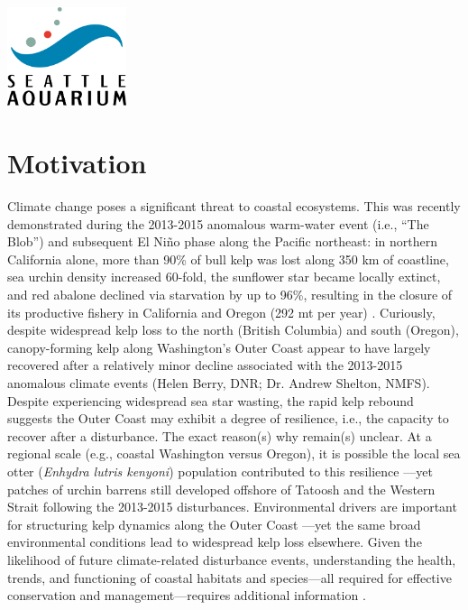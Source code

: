\documentclass[11pt]{article}
\begin{document}
\begin{titlepage}
\vspace{20pt}
\centering
\includegraphics[width=3.5cm]{logo.jpg}
\\
\end{titlepage}





\section{Motivation}
\label{Motivation}
Climate change poses a significant threat to coastal ecosystems. 
This was recently demonstrated during the 2013-2015 anomalous 
warm-water event (i.e., “The Blob”) and subsequent El Niño phase along 
the Pacific northeast: 
in northern California alone, 
more than 90\% of bull kelp was lost along 350 km of coastline, 
sea urchin density increased 60-fold, 
the sunflower star became locally extinct, 
and red abalone declined via starvation by up to 96\%, resulting in the 
closure of its productive fishery in California and Oregon (292 mt per 
year) \cite{Rogers-Bennett2019a, Gravem2021}.
Curiously, despite widespread kelp loss to the north (British Columbia) 
and south (Oregon), canopy-forming kelp along Washington's Outer Coast 
appear to have largely recovered after a relatively minor decline 
associated with the 2013-2015 anomalous climate events (Helen Berry, 
DNR; Dr. Andrew Shelton, NMFS). 
Despite experiencing widespread sea star wasting, the rapid kelp 
rebound suggests the Outer Coast may exhibit a degree of resilience, 
i.e., the capacity to recover after a disturbance.
The exact reason(s) why remain(s) unclear. 
At a regional scale (e.g., coastal Washington versus Oregon), it is 
possible the local sea otter (\textit{Enhydra lutris kenyoni}) 
population contributed to this resilience \cite{Rasher2020, Shelton2018}---yet patches of urchin barrens still developed offshore of Tatoosh and the Western Strait following the 2013-2015 disturbances. 
Environmental drivers are important for structuring kelp dynamics along 
the Outer Coast \cite{Pfister2018}---yet the same broad environmental 
conditions lead to widespread kelp loss elsewhere. 
Given the likelihood of future climate-related disturbance events, understanding the health, trends, and functioning of coastal habitats and species---all required for 
effective conservation and management---requires additional information \cite{Hughes2017}. 
\end{document}

